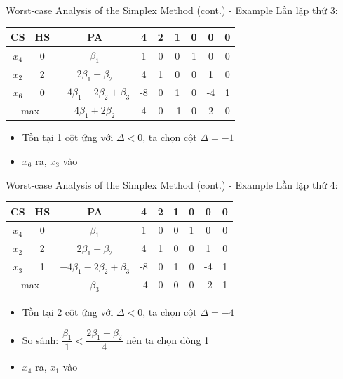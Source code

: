 \documentclass[10pt]{beamer}
\begin{document}
\begin{frame}{Worst-case Analysis of the Simplex Method (cont.) - Example}
Lần lặp thứ 3:
\begin{table}[H]
\centering
\begin{tabular}{|c|c|c|c|c|c|c|c|c|}
\hline
CS & HS & PA & 4 & 2 & 1 & 0 & 0 & 0 \\
\hline
$x_4$ & 0 & $\beta_1$ & 1 & 0 & 0 & 1 & 0 & 0 \\
$x_2$ & 2 & $2\beta_1 + \beta_2$ & 4 & 1 & 0 & 0 & 1 & 0 \\
$x_6$ & 0 & $-4\beta_1 - 2\beta_2 + \beta_3$ & -8 & 0 & 1 & 0 & -4 & 1 \\
\hline
\multicolumn{2}{|c|}{max}
& $4\beta_1 + 2\beta_2$ & 4 & 0 & -1 & 0 & 2 & 0 \\
\hline
\end{tabular}
\end{table}
\begin{itemize}
\item Tồn tại 1 cột ứng với $\Delta < 0$, ta chọn cột $\Delta = -1$
\item $x_6$ ra, $x_3$ vào
\end{itemize}
\end{frame}

\begin{frame}{Worst-case Analysis of the Simplex Method (cont.) - Example}
Lần lặp thứ 4:
\begin{table}[H]
\centering
\begin{tabular}{|c|c|c|c|c|c|c|c|c|}
\hline
CS & HS & PA & 4 & 2 & 1 & 0 & 0 & 0 \\
\hline
$x_4$ & 0 & $\beta_1$ & 1 & 0 & 0 & 1 & 0 & 0 \\
$x_2$ & 2 & $2\beta_1 + \beta_2$ & 4 & 1 & 0 & 0 & 1 & 0 \\
$x_3$ & 1 & $-4\beta_1 - 2\beta_2 + \beta_3$ & -8 & 0 & 1 & 0 & -4 & 1 \\
\hline
\multicolumn{2}{|c|}{max}
& $\beta_3$ & -4 & 0 & 0 & 0 & -2 & 1 \\
\hline
\end{tabular}
\end{table}
\begin{itemize}
\item Tồn tại 2 cột ứng với $\Delta < 0$, ta chọn cột $\Delta = -4$
\item So sánh: $\dfrac{\beta_1}{1} < \dfrac{2\beta_1 + \beta_2}{4}$ nên ta chọn dòng 1
\item $x_4$ ra, $x_1$ vào
\end{itemize}
\end{frame}
\end{document}
